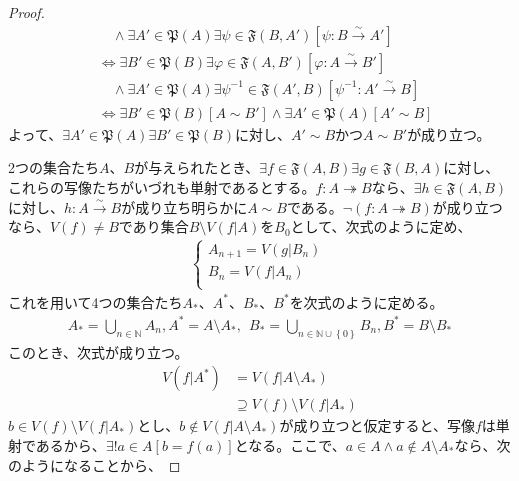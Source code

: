 \documentclass[dvipdfmx]{jsarticle}
\begin{document}
\begin{proof}
\begin{align*}
&\quad \land \exists A'\in \mathfrak{P}(A)\exists\psi\in \mathfrak{F}\left( B,A' \right)\left[ \psi:B\overset{\sim}{\rightarrow}A' \right]\\
&\Leftrightarrow \exists B'\in \mathfrak{P}(B)\exists\varphi \in \mathfrak{F}\left( A,B' \right)\left[ \varphi:A\overset{\sim}{\rightarrow}B' \right] \\
&\quad \land \exists A'\in \mathfrak{P}(A)\exists\psi^{- 1}\in \mathfrak{F}\left( A',B \right)\left[ \psi^{- 1}:A'\overset{\sim}{\rightarrow}B \right]\\
&\Leftrightarrow \exists B'\in \mathfrak{P}(B)\left[ A \sim B' \right] \land \exists A'\in \mathfrak{P}(A)\left[ A' \sim B \right]
\end{align*}
よって、$\exists A'\in \mathfrak{P}(A)\exists B'\in \mathfrak{P}(B)$に対し、$A' \sim B$かつ$A \sim B'$が成り立つ。\par
2つの集合たち$A$、$B$が与えられたとき、$\exists f\in \mathfrak{F}(A,B)\exists g \in \mathfrak{F}(B,A)$に対し、これらの写像たちがいづれも単射であるとする。$f:A \twoheadrightarrow B$なら、$\exists h\in \mathfrak{F}(A,B)$に対し、$h:A\overset{\sim}{\rightarrow}B$が成り立ち明らかに$A \sim B$である。$\neg(f:A \twoheadrightarrow B)$が成り立つなら、$V(f) \neq B$であり集合$B \setminus V\left( f|A \right)$を$B_{0}$として、次式のように定め、
\begin{align*}
\left\{ \begin{matrix}
A_{n + 1} = V\left( g|B_{n} \right) \\
B_{n} = V\left( f|A_{n} \right) \\
\end{matrix} \right.\ 
\end{align*}
これを用いて4つの集合たち$A_{*}$、$A^{*}$、$B_{*}$、$B^{*}$を次式のように定める。
\begin{align*}
A_{*} = \bigcup_{n \in \mathbb{N}} A_{n},A^{*} = A \setminus A_{*},\ \ B_{*} = \bigcup_{n \in \mathbb{N} \cup \left\{ 0 \right\}} B_{n},B^{*} = B \setminus B_{*}
\end{align*}
このとき、次式が成り立つ。
\begin{align*}
V\left( f|A^{*} \right) &= V\left( f|A \setminus A_{*} \right) \\ 
&\supseteq V(f) \setminus V\left( f|A_{*} \right)
\end{align*}
$b \in V(f) \setminus V\left( f|A_{*} \right)$とし、$b \notin V\left( f|A \setminus A_{*} \right)$が成り立つと仮定すると、写像$f$は単射であるから、$\exists!a \in A\left[ b = f(a) \right]$となる。ここで、$a \in A \land a \notin A \setminus A_{*}$なら、次のようになることから、

\end{proof}
\end{document}
